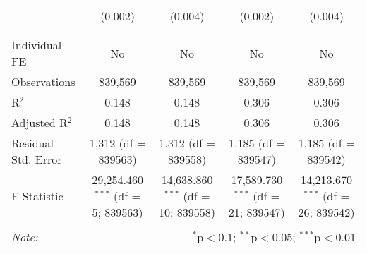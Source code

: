 \documentclass[
]{article}
\begin{document}
\begin{table}[!htbp]
{\begin{tabular}{@{\extracolsep{5pt}}lcccc}
  & (0.002) & (0.004) & (0.002) & (0.004) \\ 
  & & & & \\ 
\hline \\[-1.8ex] 
Individual FE & No & No & No & No \\ 
Observations & 839,569 & 839,569 & 839,569 & 839,569 \\ 
R$^{2}$ & 0.148 & 0.148 & 0.306 & 0.306 \\ 
Adjusted R$^{2}$ & 0.148 & 0.148 & 0.306 & 0.306 \\ 
Residual Std. Error & 1.312 (df = 839563) & 1.312 (df = 839558) & 1.185 (df = 839547) & 1.185 (df = 839542) \\ 
F Statistic & 29,254.460$^{***}$ (df = 5; 839563) & 14,638.860$^{***}$ (df = 10; 839558) & 17,589.730$^{***}$ (df = 21; 839547) & 14,213.670$^{***}$ (df = 26; 839542) \\ 
\hline 
\hline \\[-1.8ex] 
\textit{Note:}  & \multicolumn{4}{r}{$^{*}$p$<$0.1; $^{**}$p$<$0.05; $^{***}$p$<$0.01} \\ 
\end{tabular}
} 
\end{table} 
\newpage
\end{document}
